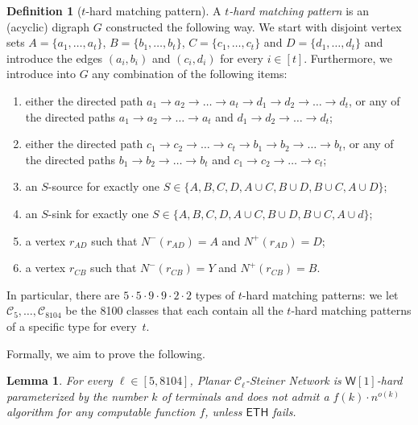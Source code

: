 \documentclass[a4paper,11pt]{article}
\theoremstyle{plain}
\newtheorem{lemma}[theorem]{Lemma}
\newtheorem{identification rule}{Identification Rule}
\theoremstyle{definition}
\newtheorem{definition}[theorem]{Definition}
\theoremstyle{remark}
\begin{document}
\begingroup
\def\thetheorem{\ref{def:cleanedorderedtoughpair}}
\begin{definition}[$t$-hard matching pattern]
A \emph{$t$-hard matching pattern} is
an (acyclic) digraph $G$ constructed the following way. We start with disjoint vertex sets $A= \{a_1,\ldots,a_t\}$, $B = \{b_1,\ldots,b_t\}$, $C = \{c_1,\ldots,c_t\}$ and $D = \{d_1,\ldots,d_t\}$ and introduce the edges $(a_i,b_i)$ and $(c_i,d_i)$ for every $i\in[t]$.
Furthermore, we introduce into $G$ any combination of the following items:
\begin{enumerate}
\item either the directed path $a_1 \rightarrow a_2 \rightarrow \ldots \rightarrow a_t \rightarrow d_1 \rightarrow d_2 \rightarrow \ldots \rightarrow d_t$, or any of the directed paths $a_1 \rightarrow a_2 \rightarrow \ldots \rightarrow a_t$ and 
$d_1 \rightarrow d_2 \rightarrow \ldots \rightarrow d_t$;
\item either the directed path $c_1 \rightarrow c_2 \rightarrow \ldots \rightarrow c_t \rightarrow b_1 \rightarrow b_2 \rightarrow \ldots \rightarrow b_t$, or any of the directed paths $b_1 \rightarrow b_2 \rightarrow \ldots \rightarrow b_t$ and $c_1 \rightarrow c_2 \rightarrow \ldots \rightarrow c_t$;
\item an $S$-source for exactly one $S \in \{A,B,C,D,A \cup C,B \cup D,B \cup C,A \cup D\}$;
\item an $S$-sink for exactly one $S \in \{A,B,C,D,A \cup C,B \cup D,B \cup C,A \cup d\}$;
\item a vertex $r_{AD}$ such that $N^-(r_{AD}) = A$ and $N^+(r_{AD}) = D$;
\item a vertex $r_{CB}$ such that $N^-(r_{CB}) = Y$ and $N^+(r_{CB}) = B$.
\end{enumerate}
In particular, there are $5 \cdot 5 \cdot 9 \cdot 9 \cdot 2 \cdot 2$ types of $t$-hard matching patterns: we let $\mathcal{C}_5, \ldots, \mathcal{C}_{8104}$ be the 8100 classes that each contain all the $t$-hard matching patterns of a specific type for every~$t$.
\end{definition}
\addtocounter{theorem}{-1}
\endgroup

Formally, we aim to prove the following.

\begin{lemma}
\label{lem:cleanedtoughpair}
For every $\ell \in [5,8104]$, 
{\sc Planar $\mathcal{C}_\ell$-Steiner Network} is $\mathsf{W}[1]$-hard parameterized by the number $k$ of terminals and does not admit a $f(k) \cdot n^{o(k)}$ algorithm for any computable function $f$,
unless $\mathsf{ETH}$ fails.
\end{lemma}
\end{document}
